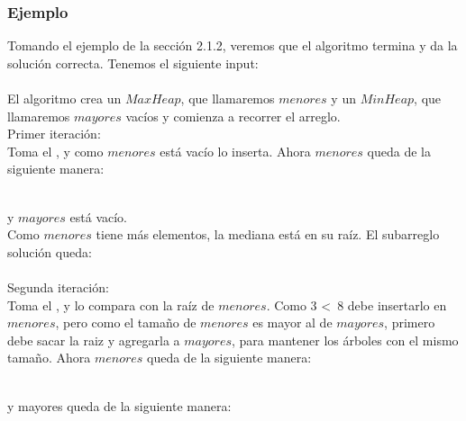 \documentclass[spanish,a4paper]{article}
\begin{document}
\subsubsection{Ejemplo}
Tomando el ejemplo de la sección 2.1.2, veremos que el algoritmo termina y da la solución correcta. Tenemos el siguiente input:\\

\\

El algoritmo crea un $MaxHeap$, que llamaremos $menores$ y un $MinHeap$, que llamaremos $mayores$ vacíos y comienza a recorrer el arreglo.\\
Primer iteración:\\
Toma el , y como $menores$ está vacío lo inserta. Ahora $menores$ queda de la siguiente manera:\\

\\
y $mayores$ está vacío.\\

Como $menores$ tiene más elementos, la mediana está en su raíz. El subarreglo solución queda:\\

\\

Segunda iteración:\\
Toma el , y lo compara con la raíz de $menores$. Como 3 \textless\ 8 debe insertarlo en $menores$, pero como el tamaño de $menores$ es mayor al de $mayores$, primero debe sacar la raiz y agregarla a $mayores$, para mantener los árboles con el mismo tamaño. Ahora $menores$ queda de la siguiente manera:\\

\\
y mayores queda de la siguiente manera:\\

\\
\end{document}
